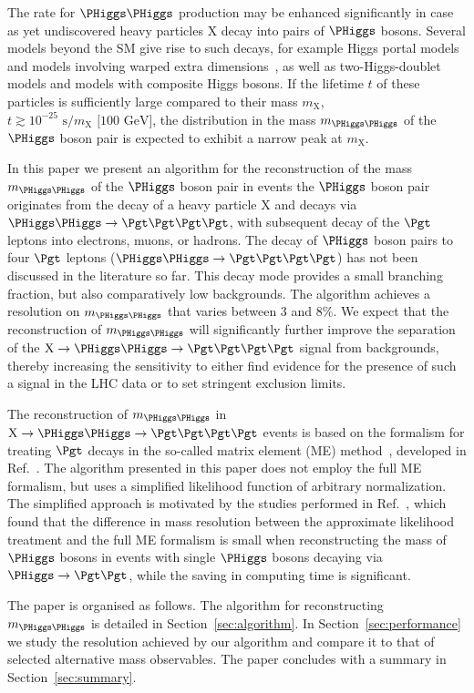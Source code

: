 The rate for $\PHiggs\PHiggs$ production may be enhanced significantly in case as yet undiscovered heavy particles $\textrm{X}$ decay into pairs of $\PHiggs$ bosons.
Several models beyond the SM give rise to such decays, 
for example Higgs portal models~\cite{Englert:2011yb,No:2013wsa} and models involving warped extra dimensions~\cite{Randall:1999ee},
as well as two-Higgs-doublet models and models with composite Higgs bosons.
If the lifetime $t$ of these particles is sufficiently large compared to their mass $m_{\textrm{X}}$, $t \gtrsim 10^{-25}\textrm{~s}/m_{\textrm{X}}\textrm{~[100~GeV]}$, 
the distribution in the mass $m_{\PHiggs\PHiggs}$ of the $\PHiggs$ boson pair is expected to exhibit a narrow peak at $m_{\textrm{X}}$.

In this paper we present an algorithm for the reconstruction of the mass $m_{\PHiggs\PHiggs}$ of the $\PHiggs$ boson pair 
in events the $\PHiggs$ boson pair originates from the decay of a heavy particle $\textrm{X}$ and decays via $\PHiggs\PHiggs \to \Pgt\Pgt\Pgt\Pgt$,
with subsequent decay of the $\Pgt$ leptons into electrons, muons, or hadrons.
The decay of $\PHiggs$ boson pairs to four $\Pgt$ leptons ($\PHiggs\PHiggs \to \Pgt\Pgt\Pgt\Pgt$) has not been discussed in the literature so far.
This decay mode provides a small branching fraction, but also comparatively low backgrounds.
The algorithm achieves a resolution on $m_{\PHiggs\PHiggs}$ that varies between $3$ and $8\%$.
We expect that the reconstruction of $m_{\PHiggs\PHiggs}$ will significantly further improve the separation of the $\textrm{X} \to \PHiggs\PHiggs \to \Pgt\Pgt\Pgt\Pgt$ signal from backgrounds,
thereby increasing the sensitivity to either find evidence for the presence of such a signal in the LHC data or to set stringent exclusion limits.

The reconstruction of $m_{\PHiggs\PHiggs}$ in $\textrm{X} \to \PHiggs\PHiggs \to \Pgt\Pgt\Pgt\Pgt$ events is
based on the formalism for treating $\Pgt$ decays in the so-called matrix element (ME) method~\cite{Kondo:1988yd,Kondo:1991dw},
developed in Ref.~\cite{SVfitMEM}.
The algorithm presented in this paper does not employ the full ME formalism,
but uses a simplified likelihood function of arbitrary normalization.
The simplified approach is motivated by the studies performed in Ref.~\cite{SVfitMEM}, 
which found that the difference in mass resolution between the approximate likelihood treatment and the full ME formalism 
is small when reconstructing the mass of $\PHiggs$ bosons in events with single $\PHiggs$ bosons decaying via $\PHiggs \to \Pgt\Pgt$,
while the saving in computing time is significant.

The paper is organised as follows. 
The algorithm for reconstructing $m_{\PHiggs\PHiggs}$ is detailed in Section~\ref{sec:algorithm}.
In Section~\ref{sec:performance} we study the resolution achieved by our algorithm and compare it to that of selected alternative mass observables.
The paper concludes with a summary in Section~\ref{sec:summary}.

